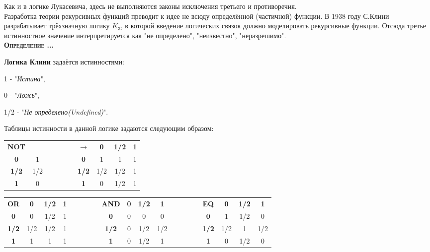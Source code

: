 \documentclass[18pt, a4paper]{extarticle}
\newcounter{par}
\newcounter{spar}
\newcounter{zap}
\newcommand{\opr}{\textbf{\textsc{Определение \thepar.\if\thespar1\thespar.\fi\thezap.\;}}\stepcounter{zap}}
\begin{document}
Как и в логике Лукасевича, здесь не выполняются законы исключения третьего и противоречия.\\

Разработка теории рекурсивных функций преводит к идее не всюду определённой (частичной) функции. В 1938 году С.Клини разрабатывает трёхзначную логику $K_3$, в которой введение логических связок должно моделировать рекурсивные функции. Отсюда третье истинностное значение интерпретируется как "не определено"{}, "неизвестно"{}, "неразрешимо"{}.\\

\opr

\textbf{Логика Клини} задаётся истинностями: 

1 - "\textit{Истина}"{}, 

0 - "\textit{Ложь}"{}, 

1/2 - "\textit{Не определено(Undefined)}"{}.

Таблицы истинности в данной логике задаются следующим образом:

\begin{center}
\begin{tabular}{|c|c|llll|c|c|c|c|}
\cline{1-2} \cline{7-10}
\textbf{NOT} & & & & & & \textbf{$\rightarrow$} & \textbf{0} & \textbf{1/2} & \textbf{1} \\
\cline{1-2} \cline{7-10}
\textbf{0} & 1 & & & & & \textbf{0} & 1 & 1 & 1 \\
\cline{1-2} \cline{7-10}
\textbf{1/2} & 1/2 & & & & & \textbf{1/2} & 1/2 & 1/2 & 1 \\
\cline{1-2} \cline{7-10}
\textbf{1} & 0 & & & & & \textbf{1} & 0 & 1/2 & 1 \\
\cline{1-2} \cline{7-10}
\end{tabular}
\end{center}

\begin{center}
\begin{tabular}{|c|c|c|c|llll|c|c|c|c|llll|c|c|c|c|}
\cline{1-4} \cline{9-12} \cline{17-20}
\textbf{OR} & \textbf{0} & \textbf{1/2} & \textbf{1} & & & & & \textbf{AND} & \textbf{0} & \textbf{1/2} & \textbf{1} & & & & & \textbf{EQ} & \textbf{0} & \textbf{1/2} & \textbf{1} \\
\cline{1-4} \cline{9-12} \cline{17-20} 
\textbf{0} & 0 & 1/2 & 1 & & & & & \textbf{0} & 0 & 0 & 0 & & & & & \textbf{0} & 1 & 1/2 & 0 \\ 
\cline{1-4} \cline{9-12} \cline{17-20} 
\textbf{1/2} & 1/2 & 1/2 & 1 & & & & & \textbf{1/2} & 0 & 1/2 & 1/2 & & & & & \textbf{1/2} & 1/2 & 1 & 1/2 \\ 
\cline{1-4} \cline{9-12} \cline{17-20} 
\textbf{1} & 1 & 1 & 1 & & & & & \textbf{1} & 0 & 1/2 & 1 & & & & & \textbf{1} & 0 & 1/2 & 0 \\ 
\cline{1-4} \cline{9-12} \cline{17-20} 
\end{tabular}
\end{center}
\end{document}
